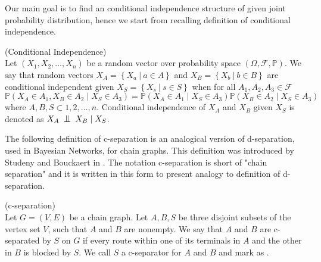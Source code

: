 
%
Our main goal is to find an conditional independence structure of given joint probability distribution, hence we start from recalling definition of conditional independence.

\begin{defi} \label{condInd} (Conditional Independence) \\
	Let $(X_1, X_2, \dots, X_n)$ be a random vector over probability space $(\Omega, \mathcal{F}, \mathbb{P})$.
	We say that random vectors $X_A = \left\{ X_a  \ | \ a \in A \right\}$ and 
	$X_B = \left\{ X_b  \ | \ b \in B \right\}$
	are conditional independent given $X_S = \left\{ X_s  \ | \ s \in S \right\}$ when 
	for all $A_1, A_2, A_3 \in \mathcal{F}$
	\begin{equation} 
		\mathbb{P}(X_A \in A_1, X_B \in A_2 \mid X_S \in A_3) = \mathbb{P}(X_A \in A_1 \mid X_S \in A_3) 													\mathbb{P}(X_B \in A_2 \mid X_S \in A_3)
	\end{equation}
	where $A, B, S \subset {1, 2, \dots, n}$. Conditional independence of $X_A$ and $X_B$
	given $X_S$ is denoted as $X_A \bigCI X_B \mid X_S$.
\end{defi}
The following definition of c-separation is an analogical version of d-separation, used in Bayesian Networks, for chain graphs. This definition was introduced by Studeny and Bouckaert in \cite{OCG}. The notation c-separation is short of "chain separation" and it is written in this form to present analogy to definition of d-separation.


\begin{defi} \label{cSepDef} (c-separation) \\
	Let $G = (V, E)$ be a chain graph. Let $A, B, S$ be three disjoint subsets of the vertex set $V$, such that
	$A$ and $B$ are nonempty. We say that $A$ and $B$ are c-separated by $S$ on $G$ if every route within one of 
	its terminals in $A$ and the other in $B$ is blocked by $S$. 
	We call $S$ a c-separator for $A$ and $B$ and mark as .
\end{defi}


